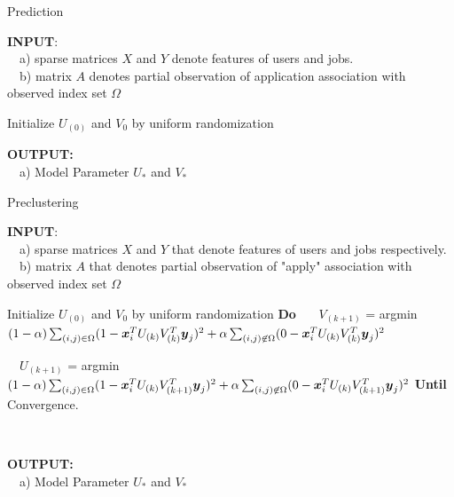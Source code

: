 \documentclass{article} %
\begin{document}
\begin{algorithm}
    \caption{Prediction}
    \label{alg:prec}
    \begin{algorithmic}[1]

\State \textbf{INPUT}: \\ \ \ a) sparse matrices $X$ and $Y$ denote features of users
and jobs. \\ \ \ b) matrix $A$ denotes partial observation of application
association with observed index set $\Omega$
\State \

\State Initialize $U_{(0)}$ and $V_{0}$ by uniform randomization
\State \

\State \textbf{OUTPUT: } \\ 
\ \ a) Model Parameter $ U_{*}$ and $V_{*}$ 
\end{algorithmic}
\end{algorithm}

\begin{algorithm}
    \caption{Preclustering}
    \label{alg:preclustering}
    \begin{algorithmic}[1]

\State \textbf{INPUT}: \\ \ \ a) sparse matrices $X$ and $Y$ that denote features of users
and jobs respectively. \\ \ \ b) matrix $A$ that denotes partial observation
of "apply" association with observed index set $\Omega$ \State \

\State Initialize $U_{(0)}$ and $V_{0}$ by uniform randomization
\State \textbf{Do}  
\State \ \ \
$V_{(k+1)}$ = argmin $(1-\alpha) \sum_{(i,j) \in \Omega} 
    (1- \boldsymbol{x}_i^T U_{(k)} V_{(k)}^T \boldsymbol{y}_j)^2 
    + \alpha \sum_{(i,j) \not \in \Omega} (0 - \boldsymbol{x}_i^T U_{(k)} V_{(k)}^T \boldsymbol{y}_j)^2$

\State \  \
$U_{(k+1)}$ = argmin $(1-\alpha) \sum_{(i,j) \in \Omega}
    (1-\boldsymbol{x}_i^T U_{(k)} V_{(k+1)}^T \boldsymbol{y}_j)^2 +
    \alpha \sum_{(i,j) \not \in \Omega}
    (0-\boldsymbol{x}_i^T U_{(k)} V_{(k+1)}^T \boldsymbol{y}_j)^2$
\State \textbf{Until} Convergence. 

\State \

\State \textbf{OUTPUT: } \\ 
\ \ a) Model Parameter $ U_{*}$ and $V_{*}$ 
\end{algorithmic}
\end{algorithm}
\end{document}
